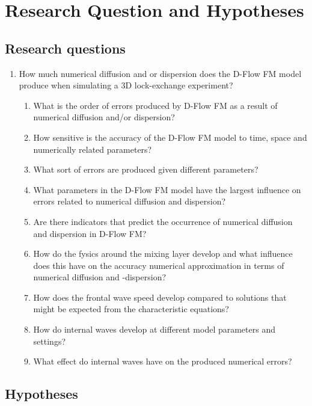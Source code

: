 \chapter{Research Question and Hypotheses}\label{research-question}

\section{Research questions}\label{research-questions}

\begin{enumerate}
\def\labelenumi{\arabic{enumi}.}
\item
  How much numerical diffusion and or dispersion does the D-Flow FM
  model produce when simulating a 3D lock-exchange experiment?

  \begin{enumerate}
  \def\labelenumii{\arabic{enumii}.}
  \item
    What is the order of errors produced by D-Flow FM as a result of
    numerical diffusion and/or dispersion?
  \item
    How sensitive is the accuracy of the D-Flow FM model to time, space
    and numerically related parameters?
  \item
    What sort of errors are produced given different parameters?
  \item
    What parameters in the D-Flow FM model have the largest influence on
    errors related to numerical diffusion and dispersion?
  \item
    Are there indicators that predict the occurrence of numerical
    diffusion and dispersion in D-Flow FM?
  \item
    How do the fysics around the mixing layer develop and what influence
    does this have on the accuracy numerical approximation in terms of
    numerical diffusion and -dispersion?
  \item
    How does the frontal wave speed develop compared to solutions that
    might be expected from the characteristic equations?
  \item
    How do internal waves develop at different model parameters and
    settings?
  \item
    What effect do internal waves have on the produced numerical errors?
  \end{enumerate}
\end{enumerate}

\section{Hypotheses}\label{hypotheses}

